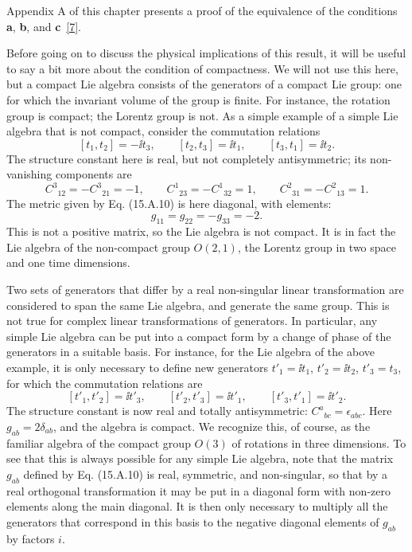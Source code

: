 Appendix A of this chapter presents a proof of the equivalence of the conditions
\textbf{a}, \textbf{b}, and \textbf{c}~\hyperref[ch15-ref-7]{[7]}.

Before going on to discuss the physical implications of this result, it will be
useful to say a bit more about the condition of compactness. We will not use this
here, but a compact Lie algebra consists of the generators of a compact Lie group:
one for which the invariant volume of the group is finite. For instance, the
rotation group is compact; the Lorentz group is not. As a simple example of a
simple Lie algebra that is not compact, consider the commutation relations
\[
 [t_1,t_2]=-\ii t_3,\qquad [t_2,t_3]=\ii t_1,\qquad [t_3,t_1]=\ii t_2 .
\]
The structure constant here is real, but not completely antisymmetric; its
non-vanishing components are
\[
 C^3{}_{12}=-C^3{}_{21}=-1,\qquad
 C^1{}_{23}=-C^1{}_{32}=1,\qquad
 C^2{}_{31}=-C^2{}_{13}=1 .
\]
The metric given by Eq. (15.A.10) is here diagonal, with elements:
\[
 g_{11}=g_{22}=-g_{33}=-2 .
\]
This is not a positive matrix, so the Lie algebra is not compact. It is in fact
the Lie algebra of the non-compact group $O(2,1)$, the Lorentz group in two space
and one time dimensions.

Two sets of generators that differ by a real non-singular linear transformation
are considered to span the same Lie algebra, and generate the same group. This is
not true for complex linear transformations of generators. In particular, any
simple Lie algebra can be put into a compact form by a change of phase of the
generators in a suitable basis. For instance, for the Lie algebra of the above
example, it is only necessary to define new generators $t'_1=\ii t_1$, $t'_2=\ii t_2$,
$t'_3=t_3$, for which the commutation relations are
\[
 [t'_1,t'_2]=\ii t'_3,\qquad [t'_2,t'_3]=\ii t'_1,\qquad [t'_3,t'_1]=\ii t'_2 .
\]
The structure constant is now real and totally antisymmetric:
$C^a{}_{bc}=\epsilon_{abc}$. Here $g_{ab}=2\delta_{ab}$, and the algebra is
compact. We recognize this, of course, as the familiar algebra of the compact
group $O(3)$ of rotations in three dimensions. To see that this is always
possible for any simple Lie algebra, note that the matrix $g_{ab}$ defined by
Eq. (15.A.10) is real, symmetric, and non-singular, so that by a real orthogonal
transformation it may be put in a diagonal form with non-zero elements along the
main diagonal. It is then only necessary to multiply all the generators that
correspond in this basis to the negative diagonal elements of $g_{ab}$ by factors
$i$.

